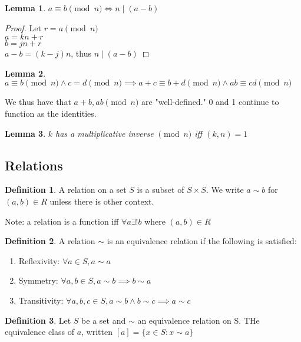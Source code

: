 \documentclass{article}
\theoremstyle{definition}
\newtheorem{definition}{Definition}
\theoremstyle{plain}
\theoremstyle{corollary}
\theoremstyle{lemma}
\newtheorem{lemma}{Lemma}
\begin{document}
\begin{lemma}
$a \equiv b \pmod{n} \iff n \mid (a-b)$
\end{lemma}

\begin{proof}
Let $r = a \pmod{n}$\\
$a = kn + r$\\
$b = jn + r$\\
$a - b = (k - j)n$, thus $n \mid (a-b)$
\end{proof}

\begin{lemma}
$a\equiv b \pmod{n}\land c=d\pmod{n}\implies a+c\equiv b+d\pmod{n}\land ab\equiv cd\pmod{n}$
\end{lemma}
We thus have that $a+b,ab\pmod{n}$ are "well-defined."
0 and 1 continue to function as the identities.

\begin{lemma}
$k$ has a multiplicative inverse $\pmod{n}$ iff $(k,n)=1$
\end{lemma}

\subsection{Relations}

\begin{definition}
A relation on a set $S$ is a subset of $S\times S$. We write $a\sim b$ for $(a,b)\in R$ unless there is other context.

Note: a relation is a function iff $\forall a\exists!b$ where $(a,b)\in R$
\end{definition}

\begin{definition}
A relation $\sim$ is an equivalence relation if the following is satisfied:
\begin{enumerate}
    \item Reflexivity: $\forall a\in S,a\sim a$
    \item Symmetry: $\forall a,b\in S, a\sim b\implies b\sim a$
    \item Transitivity: $\forall a,b,c\in S, a\sim b\land b\sim c\implies a\sim c$
\end{enumerate}
\end{definition}

\begin{definition}
Let $S$ be a set and $\sim$ an equivalence relation on S. THe equivalence class of $a$, written $[a]=\{x\in S:x\sim a\}$
\end{definition}
\end{document}
